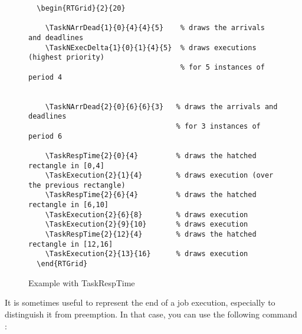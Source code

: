 \documentclass{article}
\begin{document}
\begin{figure}[!htbp]
  \centering
  \begin{RTGrid}{2}{20}
  

 

  \end{RTGrid}  
\begin{verbatim}
  \begin{RTGrid}{2}{20}
  
    \TaskNArrDead{1}{0}{4}{4}{5}    % draws the arrivals and deadlines
    \TaskNExecDelta{1}{0}{1}{4}{5}  % draws executions (highest priority) 
                                    % for 5 instances of period 4 

 
    \TaskNArrDead{2}{0}{6}{6}{3}   % draws the arrivals and deadlines
                                   % for 3 instances of period 6 

    \TaskRespTime{2}{0}{4}         % draws the hatched rectangle in [0,4]
    \TaskExecution{2}{1}{4}        % draws execution (over the previous rectangle)
    \TaskRespTime{2}{6}{4}         % draws the hatched rectangle in [6,10]
    \TaskExecution{2}{6}{8}        % draws execution
    \TaskExecution{2}{9}{10}       % draws execution
    \TaskRespTime{2}{12}{4}        % draws the hatched rectangle in [12,16]
    \TaskExecution{2}{13}{16}      % draws execution   
  \end{RTGrid}   
\end{verbatim}
  \caption{Example with TaskRespTime}
  \label{fig:resp-time}
\end{figure}

It is sometimes useful to represent the end of a job execution,
especially to distinguish it from preemption. In that case, you can
use the following command :
\end{document}
